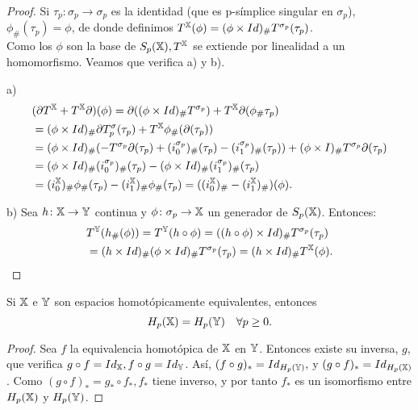 \begin{proof}
  Si $\tau_p \colon \sigma_p \to \sigma_p$ es la identidad (que es p-símplice singular en $\sigma_p$), $\phi_\#(\tau_p) = \phi$,
  de donde definimos $T^{\mathbb X}(\phi) = (\phi \times Id)_\# T^{\sigma_p}(\tau_p)$. \\
  Como los $\phi$ son la base de $S_{p}({\mathbb X}), T^{\mathbb X}$ se extiende por linealidad a un homomorfismo. Veamos que verifica a) y b).

  a)
  \begin{align*}
    &(\partial T^{\mathbb X} + T^{\mathbb X} \partial)(\phi) = \partial((\phi \times Id)_\# T^{\sigma_p}) + T^{\mathbb X} \partial(\phi_\# \tau_p) \\
    &= (\phi \times Id)_\# \partial T^\sigma_p(\tau_p) + T^{\mathbb X} \phi_\#(\partial(\tau_p)) \\
    &= (\phi \times Id)_\# (- T^{\sigma_p} \partial(\tau_p) + (i_0^{\sigma_p})_\# (\tau_p) - (i_1^{\sigma_p})_\# (\tau_p)) + (\phi \times I)_\# T^{\sigma_p}\partial(\tau_p) \\
    &= (\phi \times Id)_\# (i_0^{\sigma_p})_\#(\tau_p) - (\phi \times Id)_\# (i_1^{\sigma_p})_\#(\tau_p) \\
    &= (i_0^{\mathbb X})_\# \phi_\#(\tau_p) - (i_1^{\mathbb X})_\# \phi_\#(\tau_p) = ((i_0^{\mathbb X})_\# - (i_1^{\mathbb X})_\#) (\phi).
  \end{align*}

  b) Sea $h\colon {\mathbb X} \to {\mathbb Y}$ continua y $\phi \colon \sigma_p \to {\mathbb X}$ un generador de $S_{p}({\mathbb X})$. Entonces:
  \begin{align*}
    &T^{\mathbb Y}(h_\#(\phi)) = T^{\mathbb Y}(h \circ \phi) = ((h \circ \phi) \times Id)_\# T^{\sigma_p}(\tau_p) \\
    &= (h \times Id)_\# (\phi \times Id)_\# T^{\sigma_p} (\tau_p) = (h \times Id)_\# T^{\mathbb X}(\phi).
  \end{align*}
\end{proof}

\begin{corollary}
  Si ${\mathbb X}$ e ${\mathbb Y}$ son espacios homotópicamente equivalentes, entonces \[H_p({\mathbb X}) = H_p({\mathbb Y}) \quad \forall p \geq 0.\]
\end{corollary}

\begin{proof}
  Sea $f$ la equivalencia homotópica de ${\mathbb X}$ en ${\mathbb Y}$. Entonces existe su inversa, $g$, que verifica $g \circ f = Id_{\mathbb X}, f \circ g = Id_{\mathbb Y}$.
  Así, $(f \circ g)_* = Id_{H_p({\mathbb Y})},$ y $(g \circ f)_* = Id_{H_p({\mathbb X})}$. Como $(g \circ f)_* = g_* \circ f_*, f_*$ tiene inverso, y por tanto
  $f_*$ es un isomorfismo entre $H_p({\mathbb X})$ y $H_p({\mathbb Y})$.
\end{proof}

